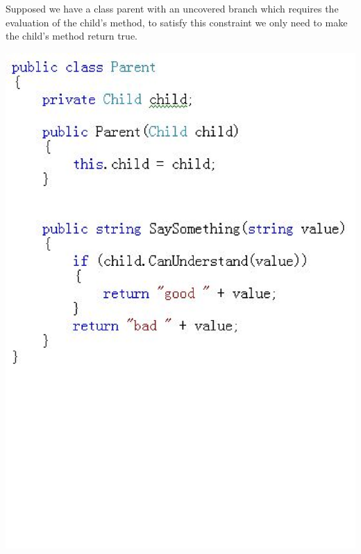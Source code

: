 Supposed we have a class parent with an uncovered branch which requires the evaluation of the child's method, to satisfy this constraint we only need to make the child's method return true.
\begin{center}
	\includegraphics[scale=0.42,keepaspectratio]{code1.eps}
\end{center}

